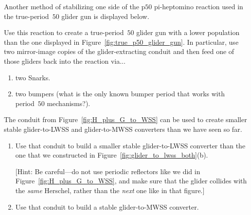 \begin{multicols}{2}
	
	\mfilbreak
	
	
	\begin{problemstar}\label{exer:p50_glider_stabilize}
		Another method of stabilizing one side of the p$50$ pi-heptomino reaction used in the true-period~$50$ glider gun is displayed below.
		\begin{center}
		\end{center}
		\noindent Use this reaction to create a true-period~$50$ glider gun with a lower population than the one displayed in Figure~\ref{fig:true_p50_glider_gun}. In particular, use two mirror-image copies of the glider-extracting conduit and then feed one of those gliders back into the reaction via...\smallskip
		
		\begin{enumerate}[label=\bf\color{ocre}(\alph*)]
			\item two Snarks.
			
			\item two bumpers (what is the only known bumper period that works with period~$50$ mechanisms?).
		\end{enumerate}
	\end{problemstar}
	
	
	\mfilbreak
	
	
	\begin{problem}\label{exer:smaller_G_to_LWSS}
		The conduit from Figure~\ref{fig:H_plus_G_to_WSS} can be used to create smaller stable glider-to-LWSS and glider-to-MWSS converters than we have seen so far.
		
		\begin{enumerate}[label=\bf\color{ocre}(\alph*)]
			\item Use that conduit to build a smaller stable glider-to-LWSS converter than the one that we constructed in Figure~\ref{fig:glider_to_lwss_both}(b).
			
			[Hint: Be careful---do not use periodic reflectors like we did in Figure~\ref{fig:H_plus_G_to_WSS}, and make sure that the glider collides with the \emph{same} Herschel, rather than the \emph{next} one like in that figure.]
			
			\item Use that conduit to build a stable glider-to-MWSS converter.
		\end{enumerate}
	\end{problem}
	

\end{multicols}
